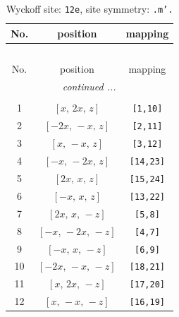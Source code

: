 \documentclass[fleqn,8pt]{jsarticle}
\begin{document}
\begin{longtable}{ccc}
\caption{Wyckoff site: {\tt 12e}, site symmetry: {\tt .m'.}}
 \\
 \hline \hline
No. & position & mapping \\ \hline \endfirsthead

\multicolumn{2}{l}{\tablename\ \thetable{}} \\
 \hline \hline
No. & position & mapping \\ \hline \endhead

 \hline \hline
\multicolumn{2}{r}{\footnotesize\it continued ...} \\ \endfoot

 \hline \hline
\multicolumn{2}{r}{} \\ \endlastfoot

1 & $\left[ x,\, 2 x,\, z \right]$ & {\tt [1,10]} \\ \hline
2 & $\left[ - 2 x,\, - x,\, z \right]$ & {\tt [2,11]} \\ \hline
3 & $\left[ x,\, - x,\, z \right]$ & {\tt [3,12]} \\ \hline
4 & $\left[ - x,\, - 2 x,\, z \right]$ & {\tt [14,23]} \\ \hline
5 & $\left[ 2 x,\, x,\, z \right]$ & {\tt [15,24]} \\ \hline
6 & $\left[ - x,\, x,\, z \right]$ & {\tt [13,22]} \\ \hline
7 & $\left[ 2 x,\, x,\, - z \right]$ & {\tt [5,8]} \\ \hline
8 & $\left[ - x,\, - 2 x,\, - z \right]$ & {\tt [4,7]} \\ \hline
9 & $\left[ - x,\, x,\, - z \right]$ & {\tt [6,9]} \\ \hline
10 & $\left[ - 2 x,\, - x,\, - z \right]$ & {\tt [18,21]} \\ \hline
11 & $\left[ x,\, 2 x,\, - z \right]$ & {\tt [17,20]} \\ \hline
12 & $\left[ x,\, - x,\, - z \right]$ & {\tt [16,19]} \\
\end{longtable}
\renewcommand{\arraystretch}{1.2}
\end{document}
